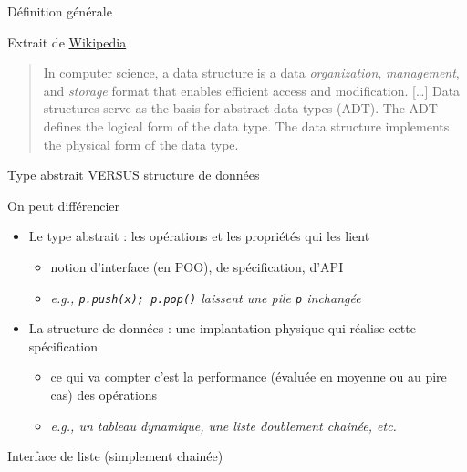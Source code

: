 \documentclass[table]{beamer}
\begin{document}
\begin{frame}{Définition générale}
  
  \begin{block}{Extrait de \href{https://en.wikipedia.org/wiki/Data_structure}{Wikipedia}}
  \begin{quote}
    In computer science, a data structure is a data \emph{organization}, \emph{management}, and \emph{storage} format that enables \alert{efficient access and modification}. [\ldots] Data structures serve as the basis for abstract data types (ADT). The ADT defines the \alert{logical form} of the data type. The data structure \alert{implements the physical form} of the data type.    
  \end{quote}
  \end{block}

\end{frame}

\begin{frame}{Type abstrait VERSUS structure de données}

  On peut différencier 
  \begin{itemize}
    \item Le \alert{type abstrait} : les opérations et les propriétés qui les lient
      \begin{itemize}
        \item notion d'interface (en POO), de spécification, d'API
        \item \emph{e.g.,  \texttt{p.push(x); p.pop()} laissent une pile \texttt{p} inchangée}
      \end{itemize}
    \item La \alert{structure de données} : une implantation physique qui réalise cette spécification
    \begin{itemize}
      \item ce qui va compter c'est la performance (évaluée en moyenne ou au pire cas) des opérations
      \item \emph{e.g., un tableau dynamique, une liste doublement chainée, etc.}
    \end{itemize}

  \end{itemize}


\end{frame}



\begin{frame}{Interface de liste (simplement chainée)}

  
\end{frame}
\end{document}
